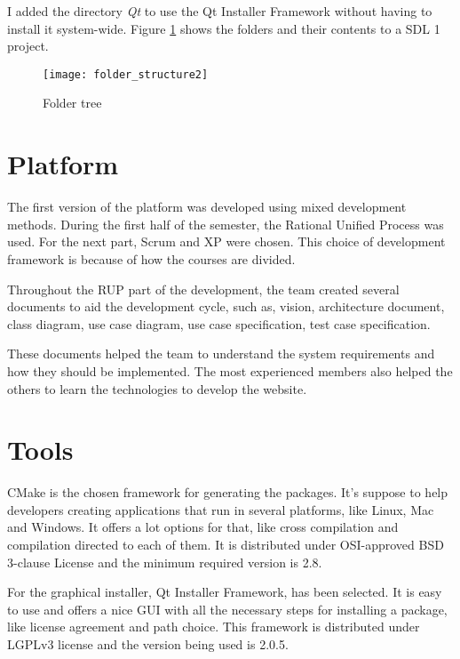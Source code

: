 I added the directory \textit{Qt} to use the Qt Installer Framework without having to install it system-wide. Figure \ref{fig:folder_structure} shows the folders and their contents to a SDL 1 project.

\begin{figure}[h!]
\centering
\texttt{[image: folder\_structure2]}
\caption{Folder tree}
\label{fig:folder_structure}
\end{figure}

\section{Platform}
\label{sec:platform}

The first version of the platform was developed using mixed development methods. During the first half of the semester, the Rational Unified Process was used. For the next part, Scrum and XP were chosen. This choice of development framework is because of how the courses are divided.

Throughout the RUP part of the development, the team created several documents to aid the development cycle, such as, vision, architecture document, class diagram, use case diagram, use case specification, test case specification.

These documents helped the team to understand the system requirements and how they should be implemented. The most experienced members also helped the others to learn the technologies to develop the website.


\section{Tools}
\label{sec:tools}

CMake is the chosen framework for generating the packages. It's suppose to help developers creating applications that run in several platforms, like Linux, Mac and Windows. It offers a lot options for that, like cross compilation and compilation directed to each of them. It is distributed under OSI-approved BSD 3-clause License and the minimum required version is 2.8.

For the graphical installer, Qt Installer Framework, has been selected. It is easy to use and offers a nice GUI with all the necessary steps for installing a package, like license agreement and path choice. This framework is distributed under LGPLv3 license and the version being used is 2.0.5.

